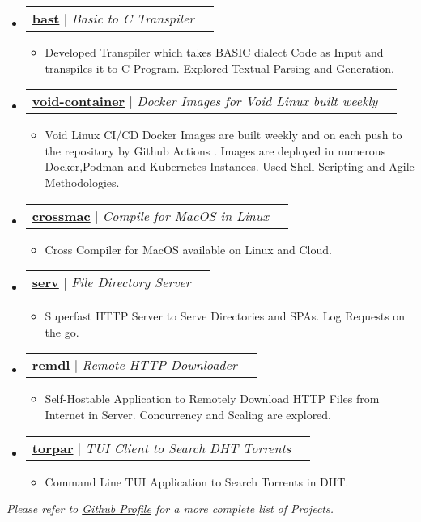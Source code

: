 \documentclass[letterpaper,11pt]{article}
\makeatletter
\newcommand{\resumeSubHeadingListStart}{\begin{itemize}[leftmargin=*]}
\newcommand{\resumeSubHeadingListEnd}{\end{itemize}}
\newcommand{\resumeProjectHeading}[2]{
    \item
    \begin{tabular*}{0.97\textwidth}{l@{\extracolsep{\fill}}r}
      \small#1 & #2 \\
    \end{tabular*}\vspace{-7pt}
}
\newcommand{\projectItemListStart}{\begin{itemize}[leftmargin=2mm]}
\newcommand{\projectItemListEnd}{\end{itemize}}
\newcommand{\projectItem}[1]{
  \item[$\diamond$]\small{
    {#1}
  }
}
\makeatother
\begin{document}
    
\resumeSubHeadingListStart
\resumeProjectHeading
{\textbf{\href{https://github.com/varbhat/bast}{bast}} $|$ \emph{Basic to C Transpiler}}{}
\projectItemListStart
\projectItem{Developed Transpiler which takes BASIC dialect Code as Input and transpiles it to C Program. Explored Textual Parsing and Generation.}
\projectItemListEnd
\resumeSubHeadingListEnd
    
    
\resumeSubHeadingListStart
\resumeProjectHeading
{\textbf{\href{https://github.com/varbhat/void-container}{void-container}} $|$ \emph{Docker Images for Void Linux built weekly}}{}
\projectItemListStart
\projectItem{Void Linux CI/CD Docker Images are built weekly and on each push to the repository by Github Actions . Images are deployed in numerous Docker,Podman and Kubernetes Instances. Used Shell Scripting and Agile Methodologies.}
\projectItemListEnd
\resumeSubHeadingListEnd
    
\resumeSubHeadingListStart
\resumeProjectHeading
{\textbf{\href{https://github.com/varbhat/crossmac}{crossmac}} $|$ \emph{Compile for MacOS in Linux}}{}
\projectItemListStart
\projectItem{Cross Compiler for MacOS available on Linux and Cloud.}
\projectItemListEnd
\resumeSubHeadingListEnd
    
 
\resumeSubHeadingListStart
\resumeProjectHeading
{\textbf{\href{https://github.com/varbhat/serv}{serv}} $|$ \emph{File Directory Server}}{}
\projectItemListStart
\projectItem{Superfast HTTP Server to Serve Directories and SPAs. Log Requests on the go.}
\projectItemListEnd
\resumeSubHeadingListEnd


\resumeSubHeadingListStart
\resumeProjectHeading
{\textbf{\href{https://github.com/varbhat/remdl}{remdl}} $|$ \emph{Remote HTTP Downloader}}{}
\projectItemListStart
\projectItem{Self-Hostable Application to Remotely Download HTTP Files from Internet in Server. Concurrency and Scaling are explored.}
\projectItemListEnd
\resumeSubHeadingListEnd



    
    

    
    
\resumeSubHeadingListStart
\resumeProjectHeading
{\textbf{\href{https://github.com/varbhat/torpar}{torpar}} $|$ \emph{TUI Client to Search DHT Torrents}}{}
\projectItemListStart
\projectItem{Command Line TUI Application to Search Torrents in DHT.}
\projectItemListEnd
\resumeSubHeadingListEnd
    

\begin{center}
	\emph{\small Please refer to \href{https://github.com/varbhat}{Github Profile} for a more complete list of Projects.}
\end{center}
\end{document}

